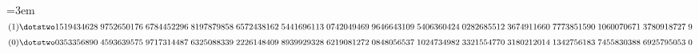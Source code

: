 \par\noindent\hangindent=3em\enspace $(1)\dotstwo1519434628\;\allowbreak 9752650176\;\allowbreak 6784452296\;\allowbreak 8197879858\;\allowbreak 6572438162\;\allowbreak 5441696113\;\allowbreak 0742049469\;\allowbreak 9646643109\;\allowbreak 5406360424\;\allowbreak 0282685512\;\allowbreak 3674911660\;\allowbreak 7773851590\;\allowbreak 1060070671\;\allowbreak 3780918727\;\allowbreak 9$ $(0)\dotstwo0353356890\;\allowbreak 4593639575\;\allowbreak 9717314487\;\allowbreak 6325088339\;\allowbreak 2226148409\;\allowbreak 8939929328\;\allowbreak 6219081272\;\allowbreak 0848056537\;\allowbreak 1024734982\;\allowbreak 3321554770\;\allowbreak 3180212014\;\allowbreak 1342756183\;\allowbreak 7455830388\;\allowbreak 6925795053\;\allowbreak 0$\par\smallskip

\par\endgroup
